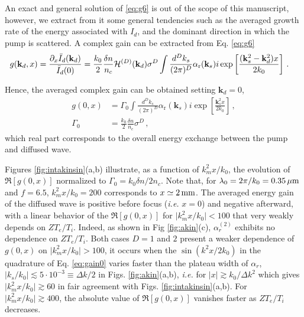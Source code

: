 \documentclass[
 reprint,
 amsmath,amssymb,
 aps,
]{revtex4-1}
\begin{document}
\begin{widetext}
\begin{figure}[!]
{ }
\end{figure}
An exact and general solution of \eqref{eq:g6} is out of the scope of this manuscript, however, we extract from it some general tendencies such as the averaged growth rate of the energy associated with $I_d$, and the dominant direction in which the pump is scattered. A complex gain can be extracted from  Eq. \eqref{eq:g6}
\begin{align}
&g(\mathbf{k}_d,x) = \frac{\partial_x\Bar{I}_d(\mathbf{k}_d)}{\Bar{I}_d(0)} %
=  \frac{k_0}{2}  \frac{\delta n}{n_c}
 \mathcal{H}^{(D)}(\mathbf{k}_d)  \sigma^D \int \frac{d^Dk_s}{(2\pi)^D}  \alpha_\mathrm{r}(\mathbf{k}_s) 
i\exp\left[ \frac{(\mathbf{k}_s^2-\mathbf{k}_d^2)x}{2k_0}\right]
\, . \label{eq:gainkd}
\end{align}
 \end{widetext}
Hence, the averaged complex gain can be obtained setting $\mathbf{k}_d=0$,
\begin{align}
g(0,x)&=  \Gamma_0 \int \frac{d^Dk_s}{(2\pi)^D}  \alpha_\mathrm{r}(\mathbf{k}_s) 
i\exp\left[ \frac{\mathbf{k}_s^2 x}{2k_0}\right]\, , \nonumber\\
\Gamma_0&=\frac{k_0}{2}  \frac{\delta n}{n_c}
  \sigma^D \, ,
\label{eq:gain0}
\end{align}
which real part corresponds to the overall energy exchange between the pump and diffused wave.

Figures \ref{fig:intakinsin}(a,b) illustrate, as a function of $k_m^2 x /k_0$, the evolution of $\Re[g(0,x)]$
normalized to $\Gamma_0=k_0\delta n / 2n_c$. Note that, for $\lambda_0=2\pi/k_0=0.35\,\rm\mu m$ and $f=6.5$,  $k_m^2 x /k_0=200$ corresponds to $x\simeq 2\,\rm mm$. 
The averaged energy gain of the diffused wave is positive before focus (\emph{i.e.} $x=0$) and negative afterward, with  a linear behavior of the $\Re[g(0,x)]$ for  $\vert k_m^2 x /k_0 \vert < 100$  that very weakly depends on $ZT_e/T_i$.  Indeed, as shown in Fig \ref{fig:akin}(c), $\alpha_r^{(2)}$ exhibits no dependence  on $ZT_e/T_i$. Both cases $D=1$ and $2$ present a weaker dependence of $g(0,x)$ on $\vert k_m^2 x /k_0 \vert > 100$, it occurs when the $\sin(k^2x/2k_0)$ in the quadrature of Eq. \eqref{eq:gain0} varies faster than the plateau width of $\alpha_r$, $\vert k_s/k_0\vert \lesssim 5\cdot 10^{-3}\equiv \Delta k /2$ in Figs. \ref{fig:akin}(a,b), \emph{i.e.} for $\vert x\vert \gtrsim k_0/\Delta k^2$ which gives $\vert k_m^2x/k_0 \vert  \gtrsim 60  $ in fair  agreement with Figs. \ref{fig:intakinsin}(a,b).
For $\vert k_m^2 x /k_0 \vert \gtrsim 400$, the absolute value of $\Re[g(0,x)]$ vanishes faster as $ZT_e/T_i$ decreases. 
\end{document}
